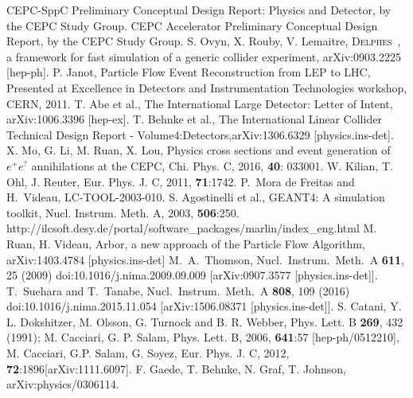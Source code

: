 \documentclass[a4paper,10pt,twoside]{cpc-hepnp}
\begin{document}
\begin{thebibliography}{90}

\vspace{3mm}

CEPC-SppC Preliminary Conceptual Design Report: Physics and Detector, by the CEPC Study Group.
CEPC Accelerator Preliminary Conceptual Design Report, by the CEPC Study Group.
S. Ovyn, X. Rouby,  V. Lemaitre, {\textsc{Delphes}~}, a framework for fast simulation of a generic collider experiment, arXiv:0903.2225 [hep-ph].
P. Janot, Particle Flow Event Reconstruction from LEP to LHC, Presented at Excellence in Detectors and Instrumentation Technologies workshop, CERN, 2011.
T. Abe et al., The International Large Detector: Letter of Intent, arXiv:1006.3396 [hep-ex].
T. Behnke et al., The International Linear Collider Technical Design Report - Volume4:Detectors,arXiv:1306.6329 [physics.ins-det].
X. Mo, G. Li, M. Ruan, X. Lou, Physics cross sections and event generation of $e^+e^?$ annihilations at the CEPC, Chi. Phys. C, 2016, {\bf 40}: 033001.
W. Kilian, T. Ohl, J. Reuter, Eur. Phys. J. C, 2011, {\bf 71}:1742.
  P.~Mora de Freitas and H.~Videau, LC-TOOL-2003-010.
S. Agostinelli et al., GEANT4: A simulation toolkit, Nucl. Instrum. Meth. A, 2003, {\bf 506}:250.
 http://ilcsoft.desy.de/portal/software\_packages/marlin/index\_eng.html
M. Ruan, H. Videau, Arbor, a new approach of the Particle Flow Algorithm, arXiv:1403.4784 [physics.ins-det]
  M.~A.~Thomson,
  Nucl.\ Instrum.\ Meth.\ A {\bf 611}, 25 (2009)
  doi:10.1016/j.nima.2009.09.009
  [arXiv:0907.3577 [physics.ins-det]].
  T.~Suehara and T.~Tanabe,
  Nucl.\ Instrum.\ Meth.\ A {\bf 808}, 109 (2016)
  doi:10.1016/j.nima.2015.11.054
  [arXiv:1506.08371 [physics.ins-det]].
 S. Catani, Y. L. Dokshitzer, M. Olsson, G. Turnock and B. R. Webber, Phys. Lett. B {\bf 269}, 432 (1991);
M. Cacciari, G. P. Salam, Phys. Lett. B, 2006, {\bf 641}:57 [hep-ph/0512210], M. Cacciari, G.P. Salam, G. Soyez, Eur. Phys. J. C, 2012, {\bf 72}:1896[arXiv:1111.6097].
F. Gaede, T. Behnke, N. Graf, T. Johnson, arXiv:physics/0306114.

\end{thebibliography}

\clearpage
\end{document}
